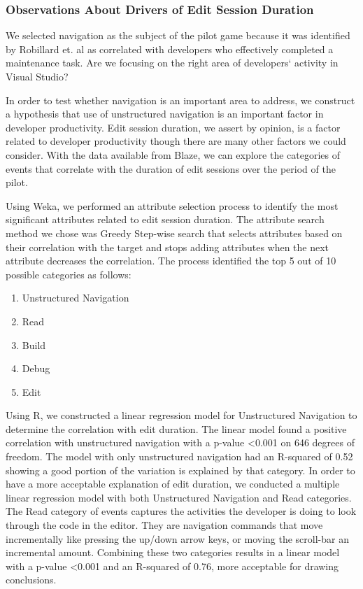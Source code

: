 \documentclass{sig-alternate}
\begin{document}
\subsubsection{Observations About Drivers of Edit Session Duration}

We selected navigation as the subject of the pilot game because it was identified by Robillard et. al\cite{wbsnipes:Robillard2004How} as correlated with developers who effectively completed a maintenance task.    Are we focusing on the right area of developers` activity in Visual Studio?

In order to test whether navigation is an important area to address, we construct a hypothesis that use of unstructured navigation is an important factor in developer productivity.  Edit session duration, we assert by opinion, is a factor related to developer productivity though there are many other factors we could consider.  With the data available from Blaze, we can explore the categories of events that correlate with the duration of edit sessions over the period of the pilot.  

Using Weka\cite{Hall2009WEKA}, we performed an attribute selection process to identify the most significant attributes related to edit session duration.  The attribute search method we chose was Greedy Step-wise search that selects attributes based on their correlation with the target and stops adding attributes when the next attribute decreases the correlation.    The process identified the top 5 out of 10 possible categories as follows:
\begin{enumerate}
\item Unstructured Navigation
\item Read
\item Build
\item Debug
\item Edit
\end{enumerate}

Using R\cite{Rcitation}, we constructed a linear regression model for Unstructured Navigation to determine the correlation with edit duration.  The linear model found a positive correlation with unstructured navigation with a p-value <0.001 on 646 degrees of freedom.  The model with only unstructured navigation had an R-squared of 0.52 showing a good portion of the variation is explained by that category.  In order to have a more acceptable explanation of edit duration, we conducted a multiple linear regression model with both Unstructured Navigation and Read categories. The Read category of events captures the activities the developer is doing to look through the code in the editor.  They are navigation commands that move incrementally like pressing the up/down arrow keys, or moving the scroll-bar an incremental amount.  Combining these two categories results in a linear model with a p-value <0.001 and an R-squared of 0.76, more acceptable for drawing conclusions.  
\end{document}
